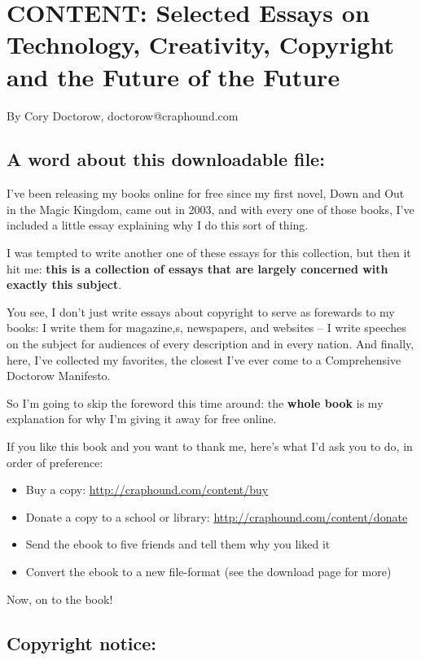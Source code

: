 \section{﻿CONTENT: Selected Essays on Technology, Creativity, Copyright and the Future of the Future}

By Cory Doctorow, doctorow@craphound.com

\subsection{A word about this downloadable file:}

I've been releasing my books online for free since my first novel,
Down and Out in the Magic Kingdom, came out in 2003, and with every
one of those books, I've included a little essay explaining why I
do this sort of thing.

I was tempted to write another one of these essays for this
collection, but then it hit me:
\textbf{this is a collection of essays that are largely concerned with exactly this subject}.

You see, I don't just write essays about copyright to serve as
forewards to my books: I write them for magazine,s, newspapers, and
websites -- I write speeches on the subject for audiences of every
description and in every nation. And finally, here, I've collected
my favorites, the closest I've ever come to a Comprehensive
Doctorow Manifesto.

So I'm going to skip the foreword this time around: the
\textbf{whole book} is my explanation for why I'm giving it away
for free online.

If you like this book and you want to thank me, here's what I'd ask
you to do, in order of preference:

\begin{itemize}
\item
  Buy a copy:
  \href{http://craphound.com/content/buy}{http://craphound.com/content/buy}
\item
  Donate a copy to a school or library:
  \href{http://craphound.com/content/donate}{http://craphound.com/content/donate}
\item
  Send the ebook to five friends and tell them why you liked it
\item
  Convert the ebook to a new file-format (see the download page for
  more)
\end{itemize}
Now, on to the book!

\subsection{Copyright notice:}

